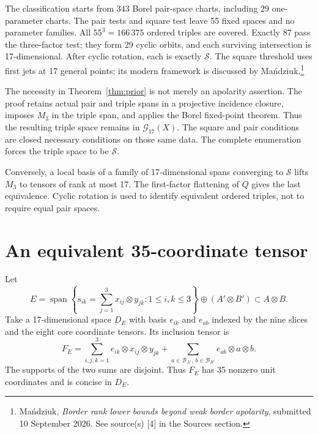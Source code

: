 \documentclass[11pt]{article}
\theoremstyle{definition}\newtheorem{definition}[theorem]{Definition}
\theoremstyle{remark}\newtheorem{remark}[theorem]{Remark}
\newcommand{\Span}{\operatorname{span}}
\newcommand{\calS}{\mathcal S}
\newcommand{\calG}{\mathcal G}
\newcommand{\src}[2]{\footnote{#1. See source(s) [#2] in the Sources section.}}
\begin{document}
The classification starts from 343 Borel pair-space charts, including 29
one-parameter charts. The pair tests and square test leave 55 fixed spaces and
no parameter families. All $55^3=166\,375$ ordered triples are covered. Exactly
87 pass the three-factor test; they form 29 cyclic orbits, and each surviving
intersection is 17-dimensional. After cyclic rotation, each is exactly $\calS$.
The square threshold uses first jets at 17 general points; its modern framework
is discussed by Ma\'ndziuk.\src{Ma\'ndziuk, \emph{Border rank lower bounds beyond weak
border apolarity}, submitted 10 September 2026}{4}

The necessity in Theorem~\ref{thm:prior} is not merely an apolarity assertion.
The proof retains actual pair and triple spans in a projective incidence
closure, imposes $M_3$ in the triple span, and applies the Borel fixed-point
theorem. Thus the resulting triple space remains in $\calG_{17}(X)$. The
square and pair conditions are closed necessary conditions on those same data.
The complete enumeration forces the triple space to be $\calS$.

Conversely, a local basis of a family of 17-dimensional spans converging to
$\calS$ lifts $M_3$ to tensors of rank at most 17. The first-factor flattening of
$Q$ gives the last equivalence. Cyclic rotation is used to identify equivalent
ordered triples, not to require equal pair spaces.

\section{An equivalent 35-coordinate tensor}

Let
\begin{equation}\label{eq:E}
 E=\Span\left\{s_{ik}=\sum_{j=1}^3x_{ij}\otimes y_{jk}:1\leq i,k\leq3\right\}
       \oplus(A'\otimes B')\subset A\otimes B.
\end{equation}
Take a 17-dimensional space $D_E$ with basis $e_{ik}$ and $e_{ab}$ indexed by the
nine slices and the eight core coordinate tensors. Its inclusion tensor is
\begin{equation}\label{eq:FE}
 F_E=\sum_{i,j,k=1}^3e_{ik}\otimes x_{ij}\otimes y_{jk}
       +\sum_{a\in\mathcal B_{A'},\ b\in\mathcal B_{B'}}e_{ab}\otimes a\otimes b.
\end{equation}
The supports of the two sums are disjoint. Thus $F_E$ has 35 nonzero unit
coordinates and is concise in $D_E$.
\end{document}
